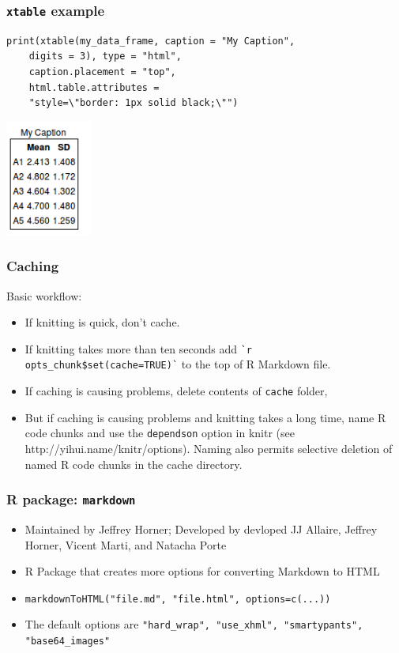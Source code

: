 \begin{frame}[fragile]\frametitle{\texttt{xtable} example}

\begin{verbatim}
print(xtable(my_data_frame, caption = "My Caption", 
    digits = 3), type = "html", 
    caption.placement = "top", 
    html.table.attributes = 
    "style=\"border: 1px solid black;\"")
\end{verbatim}

\centerline{\includegraphics[height=1.5in]{figures/simple_table.png}}

\end{frame}

\begin{frame}[fragile]\frametitle{Caching}

Basic workflow:

\begin{itemize}
\item
  If knitting is quick, don't cache.
\item
  If knitting takes more than ten seconds add
  \texttt{\`}\texttt{r opts\_chunk\$set(cache=TRUE)}\texttt{\`} to the
  top of R Markdown file.
\item
  If caching is causing problems, delete contents of \texttt{cache}
  folder,
\item
  But if caching is causing problems and knitting takes a long time,
  name R code chunks and use the \texttt{dependson} option in knitr (see
  http://yihui.name/knitr/options). Naming also permits selective
  deletion of named R code chunks in the cache directory.
\end{itemize}

\end{frame}

\begin{frame}[fragile]\frametitle{R package: \texttt{markdown}}

\begin{itemize}
\item
  Maintained by Jeffrey Horner; Developed by devloped JJ Allaire,
  Jeffrey Horner, Vicent Marti, and Natacha Porte
\item
  R Package that creates more options for converting Markdown to HTML
\item
  \texttt{markdownToHTML("file.md", "file.html", options=c(...))}
\item
  The default options are
  \texttt{"hard\_wrap", "use\_xhml", "smartypants", "base64\_images"}
\end{itemize}

\end{frame}

